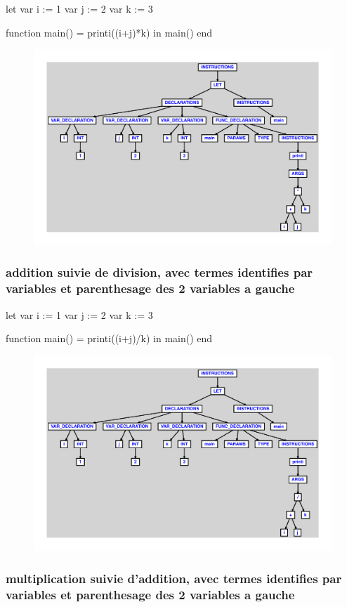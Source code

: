 \documentclass{article}
\begin{document}
\begin{verbatimtab}
let
	var i := 1
	var j := 2
	var k := 3

	function main() = printi((i+j)*k)
in main() end
\end{verbatimtab}
\begin{figure}[H]\centering\includegraphics[max width=\textwidth]{ast/ast_121.pdf}\end{figure}\subsubsection{addition suivie de division, avec termes identifies par variables et parenthesage des 2 variables a gauche}
\begin{verbatimtab}
let
	var i := 1
	var j := 2
	var k := 3

	function main() = printi((i+j)/k)
in main() end
\end{verbatimtab}
\begin{figure}[H]\centering\includegraphics[max width=\textwidth]{ast/ast_122.pdf}\end{figure}\subsubsection{multiplication suivie d'addition, avec termes identifies par variables et parenthesage des 2 variables a gauche}
\end{document}
